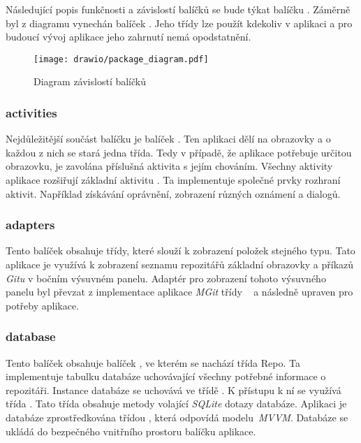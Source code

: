     Následující popis funkčnosti a závislostí balíčků se bude týkat balíčku . Záměrně byl z diagramu vynechán balíček . Jeho třídy lze použít kdekoliv v aplikaci a pro budoucí vývoj aplikace jeho zahrnutí nemá opodstatnění.

    \begin{figure}[h]
        \centering
        \vspace{0.5cm}
        \texttt{[image: drawio/package\_diagram.pdf]}
        \caption[Diagram závislostí balíčků]{Diagram závislostí balíčků}
        \label{diagram:packages}
    \end{figure}

    \newpage
    \subsubsection{activities}
    Nejdůležitější součást balíčku  je balíček . Ten aplikaci dělí na obrazovky a o každou z nich se stará jedna třída. Tedy v případě, že aplikace potřebuje určitou obrazovku, je zavolána příslušná aktivita s jejím chováním. Všechny aktivity aplikace rozšiřují základní aktivitu . Ta implementuje společné prvky rozhraní aktivit. Například získávání oprávnění, zobrazení různých oznámení a dialogů.

    \subsubsection{adapters}
    Tento balíček obsahuje třídy, které slouží k zobrazení položek stejného typu. Tato aplikace je využívá k zobrazení seznamu repozitářů základní obrazovky a příkazů \emph{Gitu} v bočním výsuvném panelu. Adaptér  pro zobrazení tohoto výsuvného panelu byl převzat z implementace aplikace \emph{MGit} třídy ~ a následně upraven pro potřeby aplikace.

    \subsubsection{database}
    Tento balíček obsahuje balíček , ve kterém se nachází třída Repo. Ta implementuje tabulku databáze uchovávající všechny potřebné informace o repozitáři. Instance databáze se uchovává ve třídě . K přístupu k ní se využívá třída . Tato třída obsahuje metody volající \emph{SQLite} dotazy databáze. Aplikaci je databáze zprostředkována třídou , která odpovídá  modelu~\emph{MVVM}. Databáze se ukládá do bezpečného vnitřního prostoru balíčku aplikace.

